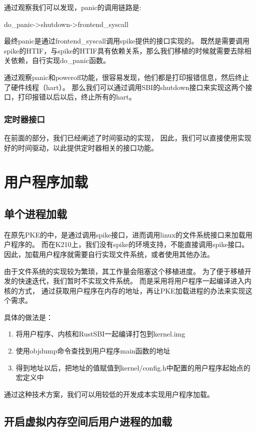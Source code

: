 通过观察我们可以发现，panic的调用链路是:

do\_panic->shutdown->frontend\_syscall

最终panic是通过frontend\_syscall调用spike提供的接口实现的。
既然是需要调用spike的HTIF，与spike的HTIF具有依赖关系，那么我们移植的时候就需要去除相关依赖，自行实现do\_panic函数。

通过观察panic和poweroff功能，很容易发现，他们都是打印报错信息，然后终止了硬件线程（hart）。
那么我们可以通过调用SBI的shutdown接口来实现这两个接口，打印报错以后以后，终止所有的hart。

\subsubsection{定时器接口}

在前面的部分，我们已经阐述了时间驱动的实现，
因此，我们可以直接使用实现好的时间驱动，以此提供定时器相关的接口功能。


\section{用户程序加载}

\subsection{单个进程加载}

在原先PKE的中，是通过调用spike接口，进而调用linux的文件系统接口来加载用户程序的。
而在K210上，我们没有spike的环境支持，不能直接调用spike接口。
因此，加载用户程序就需要自行实现文件系统，或者使用其他办法。

由于文件系统的实现较为繁琐，其工作量会阻塞这个移植进度。
为了便于移植开发的快速迭代，我们暂时不实现文件系统。
而是采用将用户程序一起编译进入内核的方式，
通过获取用户程序在内存的地址，再让PKE加载进程的办法来实现这个需求。

具体的做法是：

\begin{enumerate}
    \item 将用户程序、内核和RustSBI一起编译打包到kernel.img
    \item 使用objdump命令查找到用户程序main函数的地址
    \item 得到地址以后，把地址的值赋值到kernel/config.h中配置的用户程序起始点的宏定义中
\end{enumerate}

通过这种技术方案，我们可以用较低的开发成本实现用户程序加载。

\subsection{开启虚拟内存空间后用户进程的加载}

